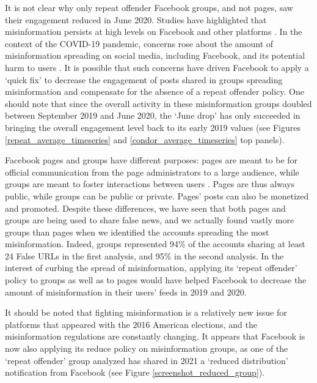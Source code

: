 \documentclass[review]{elsarticle}
\begin{document}
{It is not clear why only repeat offender Facebook groups, and not pages, saw their engagement reduced in June 2020.
Studies have highlighted that misinformation persists at high levels on Facebook and other platforms \citep{kornbluh2020new, resnick2018iffy}.
In the context of the COVID-19 pandemic, concerns rose about the amount of misinformation spreading on social media, including Facebook, and its potential harm to users \citep{johnson2020online}.
It is possible that such concerns have driven Facebook to apply a `quick fix' to decrease the engagement of posts shared in groups spreading misinformation and compensate for the absence of a repeat offender policy.
One should note that since the overall activity in these misinformation groups doubled between September 2019 and June 2020, the `June drop' has only succeeded in bringing the overall engagement level back to its early 2019 values (see Figures \ref{repeat_average_timeseries} and \ref{condor_average_timeseries} top panels).

Facebook pages and groups have different purposes: pages are meant to be for official communication from the page administrators to a large audience, while groups are meant to foster interactions between users \citep{differenceGroupAndPage}. 
Pages are thus always public, while groups can be public or private.
Pages' posts can also be monetized and promoted.
Despite these differences, we have seen that both pages and groups are being used to share false news, and we actually found vastly more groups than pages when we identified the accounts spreading the most misinformation.
Indeed, groups represented 94\% of the accounts sharing at least 24 False URLs in the first analysis, and 95\% in the second analysis.
In the interest of curbing the spread of misinformation, applying its `repeat offender' policy to groups as well as to pages would have helped Facebook to decrease the amount of misinformation in their users’ feeds in 2019 and 2020.

It should be noted that fighting misinformation is a relatively new issue for platforms that appeared with the 2016 American elections, and the misinformation regulations are constantly changing.
It appears that Facebook is now also applying its reduce policy on misinformation groups, as one of the `repeat offender' group analyzed has shared in 2021 a `reduced distribution' notification from Facebook (see Figure \ref{screenshot_reduced_group}).

}
\end{document}
